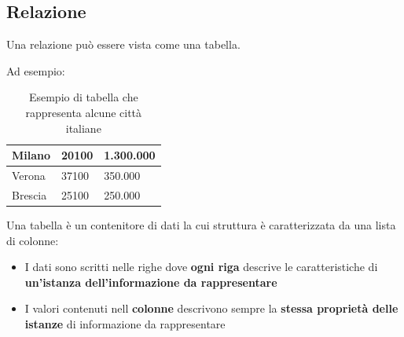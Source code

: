 \documentclass[a4paper,twoside]{article}
\begin{document}
\subsection{Relazione}
Una relazione può essere vista come una tabella.
\begin{example}
  \label{tab:esempio_relazione}
  Ad esempio:
  \begin{table}[H]
    \centering
    \begin{tabular}{|l|l|l|}
      \hline
      Milano & 20100 & 1.300.000 \\
      \hline
      Verona & 37100 & 350.000 \\
      \hline
      Brescia & 25100 & 250.000 \\
      \hline
    \end{tabular}
    \caption{Esempio di tabella che rappresenta alcune città italiane}
  \end{table}
\end{example}
Una tabella è un contenitore di dati la cui struttura è caratterizzata da una lista
di colonne:
\begin{itemize}
  \item I dati sono scritti nelle righe dove \textbf{ogni riga} descrive le caratteristiche di
    \textbf{un'istanza dell'informazione da rappresentare}
  \item I valori contenuti nell \textbf{colonne} descrivono sempre la \textbf{stessa
    proprietà delle istanze} di informazione da rappresentare
\end{itemize}
\end{document}
